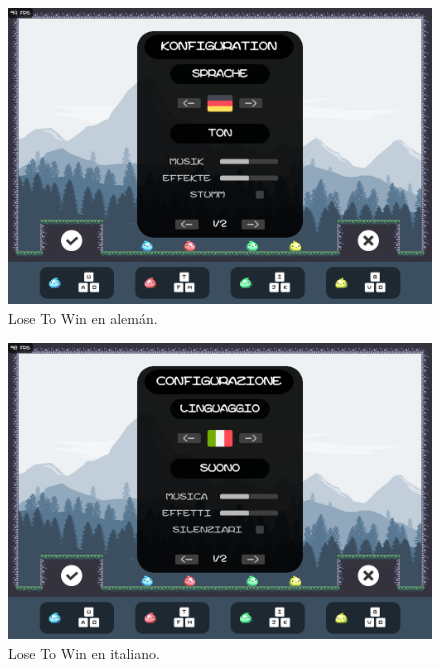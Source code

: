 \documentclass[12pt, spanish]{article}
\begin{document}
\begin{figure}[H]
	\centering
	\includegraphics[width=\textwidth]{"opciones/idiomas/german.png"}
	\caption{Lose To Win en alemán.}\label{figure:german}
\end{figure}

\begin{figure}[H]
	\centering
	\includegraphics[width=\textwidth]{"opciones/idiomas/italian.png"}
	\caption{Lose To Win en italiano.}\label{figure:italian}
\end{figure}
\end{document}
